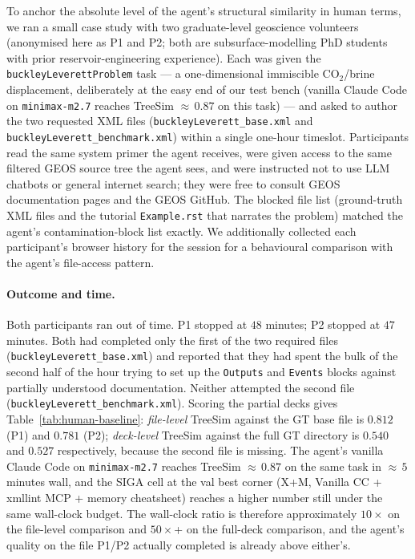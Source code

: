 \documentclass{article}
\begin{document}
To anchor the absolute level of the agent's structural similarity in human terms, we ran a small case study with two graduate-level geoscience volunteers (anonymised here as P1 and P2; both are subsurface-modelling PhD students with prior reservoir-engineering experience). Each was given the \texttt{buckleyLeverettProblem} task --- a one-dimensional immiscible CO$_2$/brine displacement, deliberately at the easy end of our test bench (vanilla Claude Code on \texttt{minimax-m2.7} reaches TreeSim ${\approx}\,0.87$ on this task) --- and asked to author the two requested XML files (\texttt{buckleyLeverett\_base.xml} and \texttt{buckleyLeverett\_benchmark.xml}) within a single one-hour timeslot. Participants read the same system primer the agent receives, were given access to the same filtered GEOS source tree the agent sees, and were instructed not to use LLM chatbots or general internet search; they were free to consult GEOS documentation pages and the GEOS GitHub. The blocked file list (ground-truth XML files and the tutorial \texttt{Example.rst} that narrates the problem) matched the agent's contamination-block list exactly. We additionally collected each participant's browser history for the session for a behavioural comparison with the agent's file-access pattern.

\paragraph{Outcome and time.} Both participants ran out of time. P1 stopped at $48$ minutes; P2 stopped at $47$ minutes. Both had completed only the first of the two required files (\texttt{buckleyLeverett\_base.xml}) and reported that they had spent the bulk of the second half of the hour trying to set up the \texttt{Outputs} and \texttt{Events} blocks against partially understood documentation. Neither attempted the second file (\texttt{buckleyLeverett\_benchmark.xml}). Scoring the partial decks gives Table~\ref{tab:human-baseline}: \emph{file-level} TreeSim against the GT base file is $0.812$ (P1) and $0.781$ (P2); \emph{deck-level} TreeSim against the full GT directory is $0.540$ and $0.527$ respectively, because the second file is missing. The agent's vanilla Claude Code on \texttt{minimax-m2.7} reaches TreeSim ${\approx}\,0.87$ on the same task in ${\approx}\,5$ minutes wall, and the SIGA cell at the val best corner (X+M, Vanilla CC + xmllint MCP + memory cheatsheet) reaches a higher number still under the same wall-clock budget. The wall-clock ratio is therefore approximately $10\times$ on the file-level comparison and $50\times$+ on the full-deck comparison, and the agent's quality on the file P1/P2 actually completed is already above either's.
\end{document}

